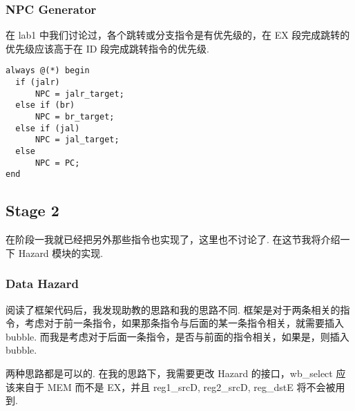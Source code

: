 \documentclass{article}
\begin{document}
\subsubsection{NPC Generator}
在 lab1 中我们讨论过，各个跳转或分支指令是有优先级的，在 EX 段完成跳转的优先级应该高于在 ID 段完成跳转指令的优先级.
\begin{verbatim}
always @(*) begin
  if (jalr)
      NPC = jalr_target;
  else if (br)
      NPC = br_target;
  else if (jal)
      NPC = jal_target;
  else
      NPC = PC;
end
\end{verbatim}
\subsection{Stage 2}
在阶段一我就已经把另外那些指令也实现了，这里也不讨论了. 在这节我将介绍一下 Hazard 模块的实现.
\subsubsection{Data Hazard}
阅读了框架代码后，我发现助教的思路和我的思路不同. 框架是对于两条相关的指令，考虑对于前一条指令，如果那条指令与后面的某一条指令相关，就需要插入 bubble. 而我是考虑对于后面一条指令，是否与前面的指令相关，如果是，则插入 bubble.

两种思路都是可以的. 在我的思路下，我需要更改 Hazard 的接口，wb\_select 应该来自于 MEM 而不是 EX，并且 reg1\_srcD, reg2\_srcD, reg\_dstE 将不会被用到.
\end{document}
